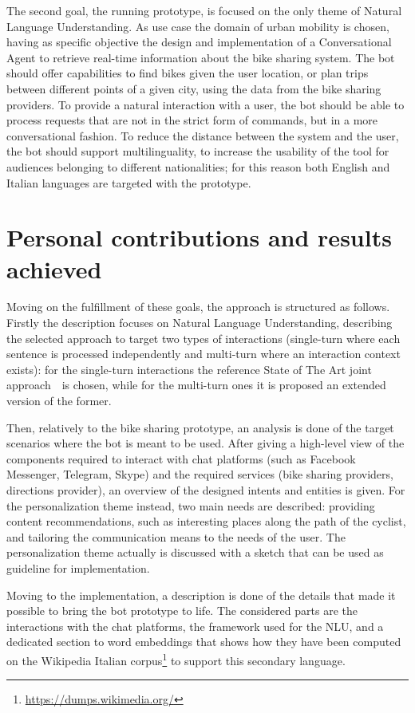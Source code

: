 The second goal, the running prototype, is focused on the only theme of Natural Language Understanding. As use case the domain of urban mobility is chosen, having as specific objective the design and implementation of a Conversational Agent to retrieve real-time information about the bike sharing system. The bot should offer capabilities to find bikes given the user location, or plan trips between different points of a given city, using the data from the bike sharing providers. To provide a natural interaction with a user, the bot should be able to process requests that are not in the strict form of commands, but in a more conversational fashion. To reduce the distance between the system and the user, the bot should support multilinguality, to increase the usability of the tool for audiences belonging to different nationalities; for this reason both English and Italian languages are targeted with the prototype.

\section*{Personal contributions and results achieved}
Moving on the fulfillment of these goals, the approach is structured as follows. Firstly the description focuses on Natural Language Understanding, describing the selected approach to target two types of interactions (single-turn where each sentence is processed independently and multi-turn where an interaction context exists): for the single-turn interactions the reference State of The Art joint approach~\cite{liu2016attention}\ is chosen, while for the multi-turn ones  it is proposed an extended version of the former.

Then, relatively to the bike sharing prototype, an analysis is done of the target scenarios where the bot is meant to be used. After giving a high-level view of the components required to interact with chat platforms (such as Facebook Messenger, Telegram, Skype) and the required services (bike sharing providers, directions provider), an overview of the designed intents and entities is given. For the personalization theme instead, two main needs are described: providing content recommendations, such as interesting places along the path of the cyclist, and tailoring the communication means to the needs of the user. The personalization theme actually is discussed with a sketch that can be used as guideline for implementation.

Moving to the implementation, a description is done of the details that made it possible to bring the bot prototype to life. The considered parts are the interactions with the chat platforms, the framework used for the NLU, and a dedicated section to word embeddings that shows how they have been computed on the Wikipedia Italian corpus\footnote{\url{https://dumps.wikimedia.org/}} to support this secondary language.

